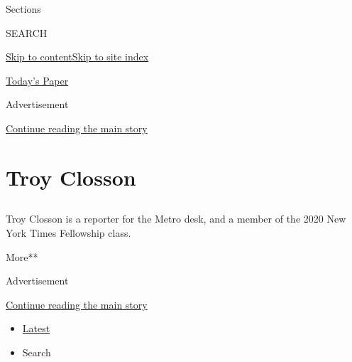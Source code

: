 Sections

SEARCH

\protect\hyperlink{site-content}{Skip to
content}\protect\hyperlink{site-index}{Skip to site index}

\href{https://myaccount.nytimes3xbfgragh.onion/auth/login?response_type=cookie\&client_id=vi}{}

\href{https://www.nytimes3xbfgragh.onion/section/todayspaper}{Today's
Paper}

Advertisement

\protect\hyperlink{after-top}{Continue reading the main story}

\hypertarget{troy-closson}{%
\section{Troy Closson}\label{troy-closson}}

\subsection{}

Troy Closson is a reporter for the Metro desk, and a member of the 2020
New York Times Fellowship class.

More**

Advertisement

\protect\hyperlink{after-mid1}{Continue reading the main story}

\begin{itemize}
\tightlist
\item
  \protect\hyperlink{stream-panel}{Latest}
\item
  Search
\end{itemize}

